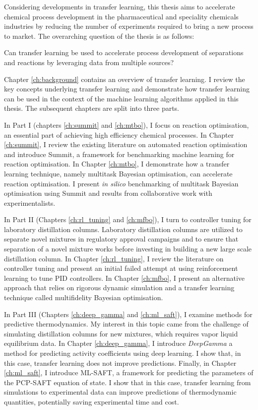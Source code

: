 Considering developments in transfer learning, this thesis aims to accelerate chemical process development in the pharmaceutical and speciality chemicals industries by reducing the number of experiments required to bring a new process to market. The overarching question of the thesis is as follows:
\begin{displayquote}
Can transfer learning be used to accelerate process development of separations and reactions by leveraging data from multiple sources? 
\end{displayquote}
Chapter \ref{ch:background} contains an overview of transfer learning. I review the key concepts underlying transfer learning and demonstrate how transfer learning can be used in the context of the machine learning algorithms applied in this thesis.  The subsequent chapters are split into three parts.

In Part I (chapters \ref{ch:summit} and \ref{ch:mtbo}), I focus on reaction optimisation, an essential part of achieving high efficiency chemical processes. In Chapter \ref{ch:summit}, I review the existing literature on automated reaction optimisation and introduce Summit, a framework for benchmarking machine learning for reaction optimisation.  In Chapter \ref{ch:mtbo}, I demonstrate how a transfer learning technique, namely multitask Bayesian optimisation, can accelerate reaction optimisation. I present \textit{in silico} benchmarking of multitask Bayesian optimisation using Summit and results from collaborative work with experimentalists.

In Part II (Chapters \ref{ch:rl_tuning} and \ref{ch:mfbo}), I turn to controller tuning for laboratory distillation columns. Laboratory distillation columns are utilized to separate novel mixtures in regulatory approval campaigns and to ensure that separation of a novel mixture works before investing in building a new large scale distillation column. In Chapter \ref{ch:rl_tuning}, I review the literature on controller tuning and present an initial failed attempt at using reinforcement learning to tune PID controllers. In Chapter \ref{ch:mfbo}, I present an alternative approach that relies on rigorous dynamic simulation and a transfer learning technique called multifidelity Bayesian optimisation.

In Part III (Chapters \ref{ch:deep_gamma} and \ref{ch:ml_saft}), I examine methods for predictive thermodynamics. My interest in this topic came from the challenge of simulating distillation columns for new mixtures, which requires vapor liquid equilibrium data. In Chapter \ref{ch:deep_gamma}, I introduce \textit{DeepGamma} a method for predicting activity coefficients using deep learning. I show that, in this case, transfer learning does not improve predictions. Finally, in Chapter \ref{ch:ml_saft}, I introduce ML-SAFT, a framework for predicting the parameters of the PCP-SAFT equation of state. I show that in this case, transfer learning from simulations to experimental data can improve predictions of thermodynamic quantities, potentially saving experimental time and cost.





